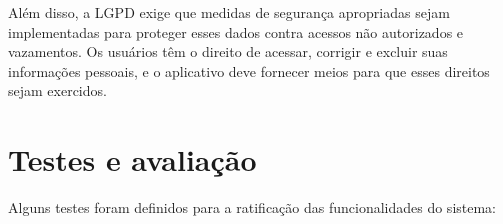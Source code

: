     Além disso, a LGPD exige que medidas de segurança apropriadas sejam implementadas para proteger esses dados contra acessos não autorizados e vazamentos. Os usuários têm o direito de acessar, corrigir e excluir suas informações pessoais, e o aplicativo deve fornecer meios para que esses direitos sejam exercidos.






\section{Testes e avaliação}
Alguns testes foram definidos para a ratificação das funcionalidades do sistema:

